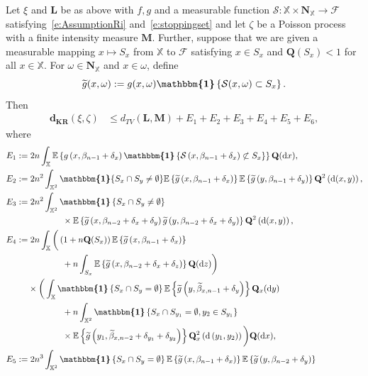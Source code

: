 \documentclass[AHL,Unicode,longabstracts]{cedram}
\newcommand*\bL{\mathbf{L}}
\newcommand*\bM{\mathbf{M}}
\newcommand*\bN{\mathbf{N}}
\newcommand{\bQ}{\mathbf{Q}}
\newcommand*\dkr{\mathbf{d_{KR}}}
\newcommand*\X{\mathbb{X}}
\newcommand{\E}{\mathbb{E}}
\newcommand*\cF{\mathcal{F}}
\newcommand*\cS{\mathcal{S}}
\newcommand*\md{\mathrm{d}}
\newcommand{\mean}[1] {\E\left\{{#1}\right\}}
\newcommand{\ind}{\boldsymbol{\mathbbm{1}}}
\newcommand{\set}[1]{\left\{#1\right\}}
\newcommand{\tg}{\tilde{g}}
\let\oldtilde\tilde
\renewcommand*{\tilde}[1]{\mathchoice{\widetilde{#1}}{\widetilde{#1}}{\oldtilde{#1}}{\oldtilde{#1}}}
\begin{document}
\begin{theo}\label{thm:binomial}
Let $\xi$ and $\bL$ be as above with $f,g$ and a measurable function $\cS: \X\times\bN_{\X}\to\cF$ satisfying~\eqref{e:AssumptionRi} and~\eqref{e:stoppingset} and let $\zeta$ be a Poisson process with a finite intensity measure $\bM$. Further, suppose that we are given a measurable mapping $x \mapsto S_{x}$ from $\X$ to $\cF$ satisfying $x \in S_{x}$ and $\bQ(S_x)<1$ for all $x\in\X$. For $\omega \in \bN_{\X}$ and $x \in \omega$, define
\[
\tg(x,\omega) := g(x,\omega)\ind\set{\cS(x,\omega) \subset S_{x}}.
\]
Then
\begin{align*}
\dkr(\xi,\zeta) & \leq d_{TV}(\bL,\bM) + E_1 + E_2 + E_3 + E_4 + E_5 + E_6,
\end{align*}
where
\begin{align*}
E_1 :=&\; 2n\int_{\X}\mean{g\left(x,\beta_{n-1}+\delta_{x}\right)\ind\set{\cS\left(x,\beta_{n-1}+\delta_{x}\right)\not \subset S_{x}}}\bQ(\md x), \allowdisplaybreaks\\
E_2 :=&\; 2n^2 \int_{\X^2} \ind\{S_x\cap S_y \neq \emptyset \} \mean{\tg\left(x,\beta_{n-1}+\delta_x\right)} \mean{\tg\left(y,\beta_{n-1}+\delta_y\right)} \bQ^2\left(\md(x,y)\right), \allowdisplaybreaks \\
E_3 :=&\; 2n^2 \int_{\X^2} \ind\left\{S_x\cap S_y \neq \emptyset \right\}\\
&\qquad\qquad \times\mean{\tg\left(x,\beta_{n-2}+\delta_x+\delta_y\right) \tg\left(y,\beta_{n-2}+\delta_x+\delta_y\right)} \bQ^2\left(\md(x,y)\right), \allowdisplaybreaks \\
E_4 :=&\; 2n\int_{\X} \bigg(\left(1+n\bQ(S_x)\right) \mean{\tg\left(x,\beta_{n-1}+\delta_x\right)}\\
&\qquad\qquad + n \int_{S_x} \mean{\tg\left(x,\beta_{n-2}+\delta_x+\delta_z\right)} \bQ(\md z) \bigg)\\
& \times \bigg(\int_{\X} \ind\left\{S_x\cap S_y=\emptyset\right\} \mean{\tg\left(y,\widetilde{\beta}_{x,n-1}+\delta_y\right)} \bQ_x(\md y)\\
& \qquad\qquad + n \int_{\X^2} \ind\left\{S_x\cap S_{y_1}=\emptyset, y_2\in S_{y_1}\right\}\\
&\qquad\qquad \times \mean{\tg\left(y_1,\widetilde{\beta}_{x,n-2}+\delta_{y_1}+\delta_{y_2}\right)} \bQ^2_x\left(\md\left(y_1,y_2\right)\right) \bigg) \bQ(\md x), \allowdisplaybreaks \\
E_5 :=&\; 2n^3 \int_{\X^2} \ind\left\{S_x\cap S_y=\emptyset\right\} \mean{\tg\left(x, \beta_{n-1}+\delta_x\right) } \mean{ \tg\left(y, \beta_{n-2}+\delta_y\right) }\\

\end{align*}
\end{theo}
\end{document}
